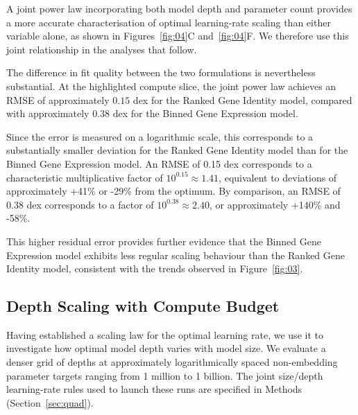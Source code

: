 \documentclass[pdflatex,sn-nature]{sn-jnl}%
\theoremstyle{thmstyleone}%
\theoremstyle{thmstyletwo}%
\theoremstyle{thmstylethree}%
\begin{document}
A joint power law incorporating both model depth and parameter count provides a more accurate characterisation of optimal learning-rate scaling than either variable alone, as shown in Figures~\ref{fig:04}C and~\ref{fig:04}F.
We therefore use this joint relationship in the analyses that follow.

The difference in fit quality between the two formulations is nevertheless substantial.
At the highlighted compute slice, the joint power law achieves an RMSE of approximately \(0.15\) dex for the Ranked Gene Identity model, compared with approximately \(0.38\) dex for the Binned Gene Expression model.

Since the error is measured on a logarithmic scale, this corresponds to a substantially smaller deviation for the Ranked Gene Identity model than for the Binned Gene Expression model.
An RMSE of 0.15 dex corresponds to a characteristic multiplicative factor of \(10^{0.15} \approx 1.41\), equivalent to deviations of approximately +41\% or -29\% from the optimum.
By comparison, an RMSE of 0.38 dex corresponds to a factor of \(10^{0.38} \approx 2.40\), or approximately +140\% and -58\%.

This higher residual error provides further evidence that the Binned Gene Expression model exhibits less regular scaling behaviour than the Ranked Gene Identity model, consistent with the trends observed in Figure~\ref{fig:03}.

\subsection{Depth Scaling with Compute Budget}

Having established a scaling law for the optimal learning rate, we use it to investigate how optimal model depth varies with model size. 
We evaluate a denser grid of depths at approximately logarithmically spaced non-embedding parameter targets ranging from 1 million to 1 billion. 
The joint size/depth learning-rate rules used to launch these runs are specified in Methods (Section~\ref{sec:quad}).
\end{document}
